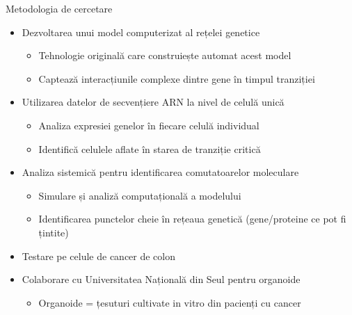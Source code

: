 \documentclass{beamer}
\begin{document}
	\begin{frame}[allowframebreaks]{Metodologia de cercetare}
		\begin{itemize}
			\item Dezvoltarea unui model computerizat al rețelei genetice
			\begin{itemize}
				\item Tehnologie originală care construiește automat acest model
				\item Captează interacțiunile complexe dintre gene în timpul tranziției
			\end{itemize}
			\item Utilizarea datelor de secvențiere ARN la nivel de celulă unică
			\begin{itemize}
				\item Analiza expresiei genelor în fiecare celulă individual
				\item Identifică celulele aflate în starea de tranziție critică
			\end{itemize}
			\item Analiza sistemică pentru identificarea comutatoarelor moleculare
			\begin{itemize}
				\item Simulare și analiză computațională a modelului
				\item Identificarea punctelor cheie în rețeaua genetică (gene/proteine ce pot fi țintite)
			\end{itemize}
			\item Testare pe celule de cancer de colon
			\item Colaborare cu Universitatea Națională din Seul pentru organoide
			\begin{itemize}
				\item Organoide = țesuturi cultivate in vitro din pacienți cu cancer
			\end{itemize}
		\end{itemize}
		
		\framebreak
		
			
	\end{frame}
	
\end{document}
